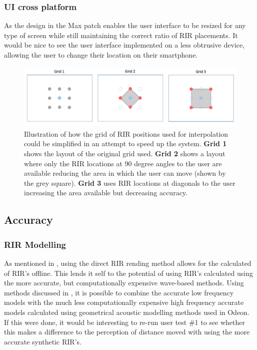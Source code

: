 \documentclass[../../main.tex]{subfiles}
\begin{document}
		\subsubsection{UI cross platform}
			As the design in the Max patch enables the user interface to be resized for any type of screen while still maintaining the correct ratio of \ac{RIR} placements. It would be nice to see the user interface implemented on a less obtrusive device, allowing the user to change their location on their smartphone.

			\begin{figure}[H]
				\centerline{\includegraphics[scale = 0.45]{Sections/FurtherWork/images/grids2.png}}
				\caption{Illustration of how the grid of \ac{RIR} positions used for interpolation could be simplified in an attempt to speed up the system. \textbf{Grid 1} shows the layout of the original grid used. \textbf{Grid 2} shows a layout where only the \ac{RIR} locations at 90 degree angles to the user are available reducing the area in which the user can move (shown by the grey square). \textbf{Grid 3} uses \ac{RIR} locations at diagonals to the user increasing the area available but decreasing accuracy.}
				\label{grids}
			\end{figure}

	\subsection{Accuracy}
		\subsubsection{RIR Modelling}
			As mentioned in , using the direct \ac{RIR} rending method allows for the calculated of \ac{RIR}'s offline. This lends it self to the potential of using \ac{RIR}'s calculated using the more accurate, but computationally expensive wave-based methods. Using methods discussed in \cite{Southern}, it is possible to combine the accurate low frequency models with the much less computationally expensive high frequency accurate models calculated using geometrical acoustic modelling methods used in Odeon. If this were done, it would be interesting to re-run user test \#1 to see whether this makes a difference to the perception of distance moved with using the more accurate synthetic \ac{RIR}'s.
\end{document}
